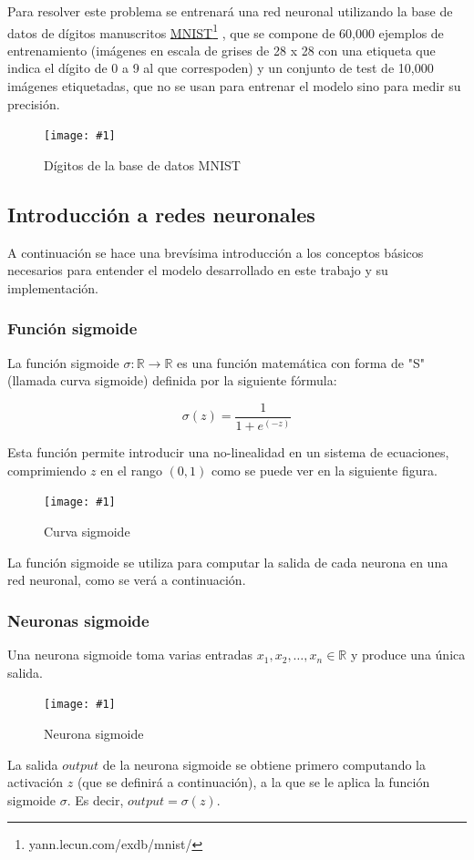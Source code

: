 \documentclass[a4paper, 10pt, twoside]{article}
\newcommand{\img}[3]{
  \begin{figure}[H]
    \begin{center}
      \texttt{[image: \#1]}
    \end{center}
    \caption{#2}
    \label{#3}
  \end{figure}
}
\newcommand{\link}[2]{
  \href{#1}{#2}\footnote{#1}
}
\begin{document}
Para resolver este problema se entrenará una red neuronal utilizando la base de
datos de dígitos manuscritos \link{yann.lecun.com/exdb/mnist/}{MNIST}, que se
compone de 60,000 ejemplos de entrenamiento (imágenes en escala de grises de 28
x 28 con una etiqueta que indica el dígito de 0 a 9 al que correspoden) y un
conjunto de test de 10,000 imágenes etiquetadas, que no se usan para entrenar
el modelo sino para medir su precisión.

\img{mnist-digits.png}{Dígitos de la base de datos MNIST}{img:mnist-digits}


\subsection{Introducción a redes neuronales}

A continuación se hace una brevísima introducción a los conceptos básicos
necesarios para entender el modelo desarrollado en este trabajo y su
implementación.


\subsubsection{Función sigmoide}

La función sigmoide $\sigma: \mathbb{R} \rightarrow \mathbb{R}$ es una función
matemática con forma de "S" (llamada curva sigmoide) definida por la siguiente
fórmula:

$$\sigma(z) = \frac{1}{1 + e^(-z)}$$

Esta función permite introducir una no-linealidad en un sistema de ecuaciones,
comprimiendo $z$ en el rango $(0, 1)$ como se puede ver en la siguiente figura.

\img{sigmoid-curve.png}{Curva sigmoide}{img:sigmoid-curve}

La función sigmoide se utiliza para computar la salida de cada neurona en una
red neuronal, como se verá a continuación.


\subsubsection{Neuronas sigmoide}

Una neurona sigmoide toma varias entradas $x_1, x_2, \ldots, x_n \in
\mathbb{R}$ y produce una única salida.

\img{neuron.png}{Neurona sigmoide}{img:neuron}

La salida $\mathit{output}$ de la neurona sigmoide se obtiene primero
computando la activación $z$ (que se definirá a continuación), a la que se le
aplica la función sigmoide $\sigma$. Es decir, $\mathit{output} = \sigma(z)$.
\end{document}
